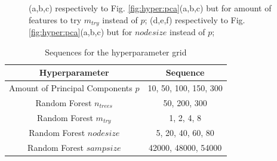 \documentclass[conference]{IEEEtran}
\begin{document}
\begin{figure}[ht!]
    \quad
    \quad
    \quad

    \caption{
        \color{til}
        (a,b,c) respectively to Fig. \ref{fig:hyper:pca}(a,b,c) but for amount of features to try $m_{try}$ instead of $p$; (d,e,f) respectively to Fig. \ref{fig:hyper:pca}(a,b,c) but for ${nodesize}$ instead of $p$;
    }
    \label{fig:hyper:mtry}
\end{figure}

\begin{table}[b!]
    \color{til}
    \caption{\color{til}Sequences for the hyperparameter grid}
    \begin{center}
    \begin{tabular}{|c|c|}
        \hline
        \textbf{Hyperparameter} & \textbf{Sequence} \\
        \hline
        Amount of Principal Components $p$ & 10, 50, 100, 150, 300\\
        \hline
        Random Forest $n_{trees}$ & 50, 200, 300\\
        \hline
        Random Forest $m_{try}$ & 1, 2, 4, 8\\
        \hline
        Random Forest ${nodesize}$ & 5, 20, 40, 60, 80\\
        \hline
        Random Forest ${sampsize}$ & 42000, 48000, 54000\\
        \hline
    \end{tabular}
    \label{table:hyperParamGrid}
    \end{center}
\end{table}
\end{document}
